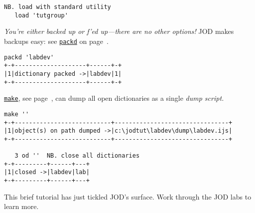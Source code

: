 \begin{description}
\begin{lstlisting}[frame=single,framerule=0pt]
   NB. load with standard utility
   load 'tutgroup'  
\end{lstlisting}

\item[Backup the put dictionary.] \emph{You're either backed up or f'ed up---there are
no other options!} JOD makes backups 
easy: see \hyperlink{il:packd}{\texttt{packd}} on page~\pageref{ss:packd}.
\begin{lstlisting}[frame=single,framerule=0pt] 
   packd 'labdev'
+-+--------------------+------+-+
|1|dictionary packed ->|labdev|1|
+-+--------------------+------+-+
\end{lstlisting}

\item[Dump dictionaries on path.] \hyperlink{il:make}{\texttt{make}}, see page~\pageref{ss:make},
can dump all open dictionaries as a single \emph{dump script.}
\begin{lstlisting}[frame=single,framerule=0pt]
   make ''
+-+---------------------------+--------------------------------+
|1|object(s) on path dumped ->|c:\jodtut\labdev\dump\labdev.ijs|
+-+---------------------------+--------------------------------+

   3 od '' 	NB. close all dictionaries
+-+---------+------+---+
|1|closed ->|labdev|lab|
+-+---------+------+---+
\end{lstlisting}

\end{description}

This brief tutorial has just tickled JOD's surface.  Work through the JOD labs to learn more.